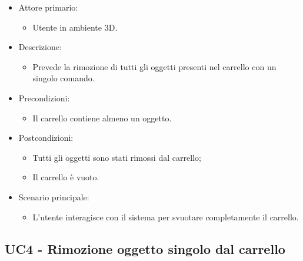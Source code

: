 \begin{itemize}
	
	\item Attore primario: 
	\begin{itemize}
		\item Utente in ambiente 3D.
	\end{itemize}
	\item Descrizione:
	\begin{itemize}
		\item Prevede la rimozione di tutti gli oggetti presenti nel carrello con un singolo comando.
	\end{itemize}
	
	\item Precondizioni:
	\begin{itemize}
		\item Il carrello contiene almeno un oggetto.
	\end{itemize}
	
	\item Postcondizioni:
	\begin{itemize}
		\item Tutti gli oggetti sono stati rimossi dal carrello;
		\item Il carrello è vuoto.
	\end{itemize}
	
	\item Scenario principale:
	\begin{itemize}
		\item L'utente interagisce con il sistema per svuotare completamente il carrello.
	\end{itemize}
	
\end{itemize}

\pagebreak
\subsection{UC4 - Rimozione oggetto singolo dal carrello}

